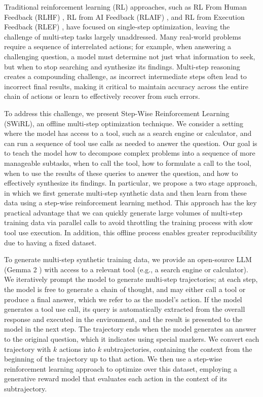 \documentclass{article} %
\begin{document}
Traditional reinforcement learning (RL) approaches, such as RL From Human Feedback (RLHF) \citep{christiano2017rlhf}, RL from AI Feedback (RLAIF) \citep{bai2022constitutionalaiharmlessnessai}, and RL from Execution Feedback (RLEF) \citep{gehring2025rlefgroundingcodellms}, have focused on single-step optimization, leaving the challenge of multi-step tasks largely unaddressed. Many real-world problems require a sequence of interrelated actions; for example, when answering a challenging question, a model must determine not just what information to seek, but when to stop searching and synthesize its findings. Multi-step reasoning creates a compounding challenge, as incorrect intermediate steps often lead to incorrect final results, making it critical to maintain accuracy across the entire chain of actions or learn to effectively recover from such errors. 

To address this challenge, we present Step-Wise Reinforcement Learning (SWiRL), an offline multi-step optimization technique. We consider a setting where the model has access to a tool, such as a search engine or calculator, and can run a sequence of tool use calls as needed to answer the question. Our goal is to teach the model how to decompose complex problems into a sequence of more manageable subtasks, when to call the tool, how to formulate a call to the tool, when to use the results of these queries to answer the question, and how to effectively synthesize its findings. In particular, we propose a two stage approach, in which we first generate multi-step synthetic data and then learn from these data using a step-wise reinforcement learning method. This approach has the key practical advantage that we can quickly generate large volumes of multi-step training data via parallel calls to avoid throttling the training process with slow tool use execution. In addition, this offline process enables greater reproducibility due to having a fixed dataset.


To generate multi-step synthetic training data, we provide an open-source LLM (Gemma 2 \citep{gemma2024gemma2improvingopen}) with access to a relevant tool (e.g., a search engine or calculator). We iteratively prompt the model to generate multi-step trajectories; at each step, the model is free to generate a chain of thought, and may either call a tool or produce a final answer, which we refer to as the model's action. If the model generates a tool use call, its query is automatically extracted from the overall response and executed in the environment, and the result is presented to the model in the next step. 
The trajectory ends when the model generates an answer to the original question, which it indicates using special markers. We convert each trajectory with $k$ actions into $k$ subtrajectories, containing the context from the beginning of the trajectory up to that action. We then use a step-wise reinforcement learning approach to optimize over this dataset, employing a generative reward model that evaluates each action in the context of its subtrajectory. 
\end{document}
